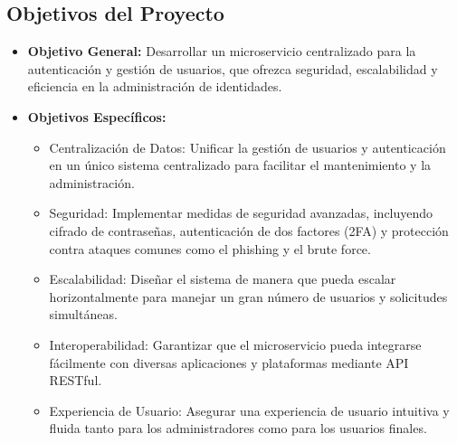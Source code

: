 \subsection{Objetivos del Proyecto}

\begin{itemize}
    \item \textbf{Objetivo General:} Desarrollar un microservicio centralizado para la autenticación y gestión de usuarios, que ofrezca seguridad, escalabilidad y eficiencia en la administración de identidades.
    \item \textbf{Objetivos Específicos:}
          \begin{itemize}
              \item Centralización de Datos: Unificar la gestión de usuarios y autenticación en un único sistema centralizado para facilitar el mantenimiento y la administración.
              \item Seguridad: Implementar medidas de seguridad avanzadas, incluyendo cifrado de contraseñas, autenticación de dos factores (2FA) y protección contra ataques comunes como el phishing y el brute force.
              \item Escalabilidad: Diseñar el sistema de manera que pueda escalar horizontalmente para manejar un gran número de usuarios y solicitudes simultáneas.
              \item Interoperabilidad: Garantizar que el microservicio pueda integrarse fácilmente con diversas aplicaciones y plataformas mediante API RESTful.
              \item Experiencia de Usuario: Asegurar una experiencia de usuario intuitiva y fluida tanto para los administradores como para los usuarios finales.
          \end{itemize}
\end{itemize}
